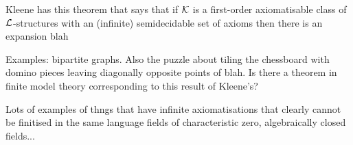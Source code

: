Kleene has this theorem that says that if ${\cal K}$ is a first-order axiomatisable class of ${\cal L}$-structures with an (infinite) semidecidable set of axioms then there is an expansion blah

Examples: bipartite graphs.  Also the puzzle about tiling the chessboard with domino pieces leaving diagonally opposite points of blah.   Is there a theorem in finite model theory corresponding to this result of Kleene's?

Lots of examples of thngs that have infinite axiomatisations that clearly cannot be finitised in the same language  fields of characteristic zero, algebraically closed fields...